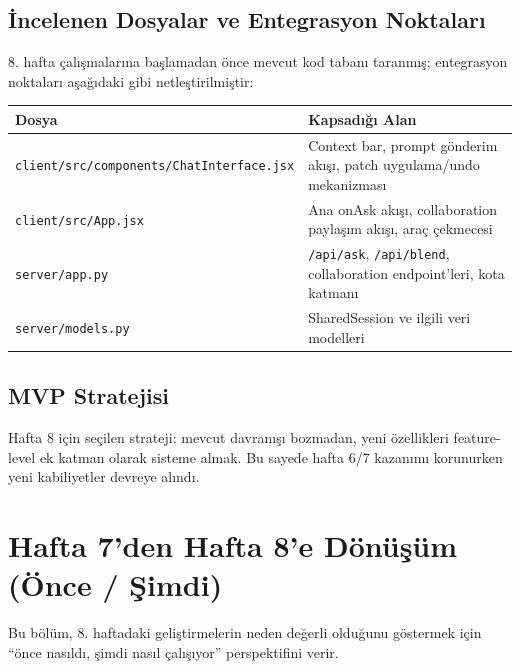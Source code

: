 \documentclass[11pt,a4paper]{article}
\begin{document}
\subsection{İncelenen Dosyalar ve Entegrasyon Noktaları}

8. hafta çalışmalarına başlamadan önce mevcut kod tabanı taranmış; entegrasyon noktaları aşağıdaki gibi netleştirilmiştir:

\begin{tabularx}{\textwidth}{@{} L{5.5cm} X @{}}
\toprule
\textbf{Dosya} & \textbf{Kapsadığı Alan} \\
\midrule
\texttt{client/src/components/ChatInterface.jsx} & Context bar, prompt gönderim akışı, patch uygulama/undo mekanizması \\
\addlinespace
\texttt{client/src/App.jsx} & Ana onAsk akışı, collaboration paylaşım akışı, araç çekmecesi \\
\addlinespace
\texttt{server/app.py} & \texttt{/api/ask}, \texttt{/api/blend}, collaboration endpoint'leri, kota katmanı \\
\addlinespace
\texttt{server/models.py} & SharedSession ve ilgili veri modelleri \\
\bottomrule
\end{tabularx}

\subsection{MVP Stratejisi}

\begin{notebox}
Hafta 8 için seçilen strateji: mevcut davranışı bozmadan, yeni özellikleri feature-level ek katman olarak sisteme almak.
Bu sayede hafta 6/7 kazanımı korunurken yeni kabiliyetler devreye alındı.
\end{notebox}

\section{Hafta 7'den Hafta 8'e Dönüşüm (Önce / Şimdi)}

Bu bölüm, 8. haftadaki geliştirmelerin neden değerli olduğunu göstermek için ``önce nasıldı, şimdi nasıl çalışıyor'' perspektifini verir.
\end{document}

